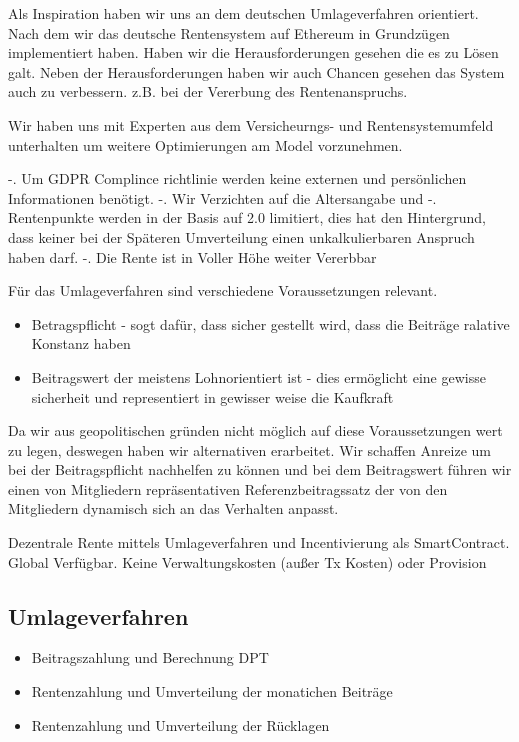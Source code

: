 Als Inspiration haben wir uns an dem deutschen Umlageverfahren orientiert. Nach dem wir das deutsche Rentensystem auf Ethereum in Grundzügen implementiert haben. Haben wir die Herausforderungen gesehen die es zu Lösen galt.
Neben der Herausforderungen haben wir auch Chancen gesehen das System auch zu verbessern. z.B. bei der Vererbung des Rentenanspruchs.

Wir haben uns mit Experten aus dem Versicheurngs- und Rentensystemumfeld unterhalten um weitere Optimierungen am Model vorzunehmen.

-. Um GDPR Complince richtlinie werden keine externen und persönlichen Informationen benötigt.
-. Wir Verzichten auf die Altersangabe und
-. Rentenpunkte werden in der Basis auf 2.0 limitiert, dies hat den Hintergrund, dass keiner bei der Späteren Umverteilung einen unkalkulierbaren Anspruch haben darf.
-. Die Rente ist in Voller Höhe weiter Vererbbar


Für das Umlageverfahren sind verschiedene Voraussetzungen relevant. 

\begin{itemize}
\item Betragspflicht - sogt dafür, dass sicher gestellt wird, dass die Beiträge ralative Konstanz haben
\item Beitragswert der meistens Lohnorientiert ist - dies ermöglicht eine gewisse sicherheit und representiert in gewisser weise die Kaufkraft
\end{itemize}

Da wir aus geopolitischen gründen nicht möglich auf diese Voraussetzungen wert zu legen, deswegen haben wir alternativen erarbeitet.
Wir schaffen Anreize um bei der Beitragspflicht nachhelfen zu können und bei dem Beitragswert führen wir einen von Mitgliedern repräsentativen Referenzbeitragssatz der von den Mitgliedern dynamisch sich an das Verhalten anpasst.


Dezentrale Rente mittels Umlageverfahren und Incentivierung als SmartContract.
Global Verfügbar. Keine Verwaltungskosten (außer Tx Kosten) oder Provision

\subsection{Umlageverfahren}

\begin{itemize}
\item Beitragszahlung und Berechnung DPT
\item Rentenzahlung und Umverteilung der monatichen Beiträge
\item Rentenzahlung und Umverteilung der Rücklagen
\end{itemize}

